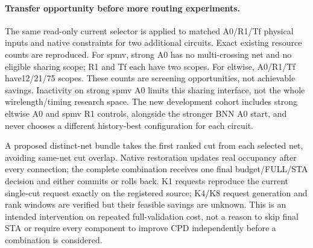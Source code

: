 \paragraph{Transfer opportunity before more routing experiments.}
The same read-only current selector is applied to matched A0/R1/Tf physical inputs and native constraints for two additional circuits. Exact existing resource counts are reproduced. For spmv, strong A0 has no multi-crossing net and no eligible sharing scope; R1 and Tf each have two scopes. For eltwise, A0/R1/Tf have12/21/75 scopes. These counts are screening opportunities, not achievable savings. Inactivity on strong spmv A0 limits this sharing interface, not the whole wirelength/timing research space. The new development cohort includes strong eltwise A0 and spmv R1 controls, alongside the stronger BNN A0 start, and never chooses a different history-best configuration for each circuit.

A proposed distinct-net bundle takes the first ranked cut from each selected net, avoiding same-net cut overlap. Native restoration updates real occupancy after every connection; the complete combination receives one final budget/FULL/STA decision and either commits or rolls back. K1 requests reproduce the current single-cut request exactly on the registered source; K4/K8 request generation and rank windows are verified but their feasible savings are unknown. This is an intended intervention on repeated full-validation cost, not a reason to skip final STA or require every component to improve CPD independently before a combination is considered.

